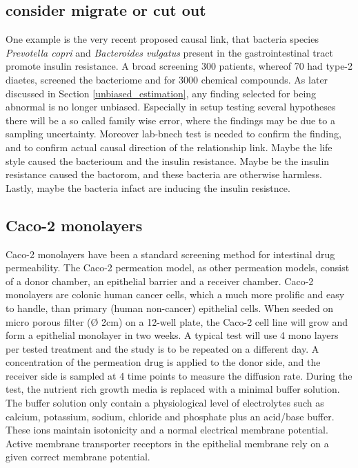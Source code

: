 \subsection{consider migrate or cut out}
One example is the very recent proposed causal link, that bacteria species \textit{Prevotella copri} and \textit{Bacteroides vulgatus} present in the gastrointestinal tract promote insulin resistance. A broad screening 300 patients, whereof 70 had type-2 diaetes, screened the bacteriome and for 3000 chemical compounds. As later discussed in Section \ref{unbiased_estimation}, any finding selected for being abnormal is no longer unbiased. Especially in setup testing several hypotheses there will be a so called family wise error, where the findings may be due to a sampling uncertainty. Moreover lab-bnech test is needed to confirm the finding, and to confirm actual causal direction of the relationship link. Maybe the life style caused the bacterioum and the insulin resistance. Maybe be the insulin resistance caused the bactorom, and these bacteria are otherwise harmless. Lastly, maybe the bacteria infact are inducing the insulin resistnce. \cite{pedersen2016human}


\subsection{Caco-2 monolayers}
Caco-2 monolayers have been a standard screening method for intestinal drug permeability. The Caco-2 permeation model, as other permeation models, consist of a donor chamber, an epithelial barrier and a receiver chamber. Caco-2 monolayers are colonic human cancer cells, which a much more prolific and easy to handle, than primary (human non-cancer) epithelial cells. When seeded on micro porous filter (Ø 2cm) on a 12-well plate, the Caco-2 cell line will grow and form a epithelial monolayer in two weeks. A typical test will use 4 mono layers per tested treatment and the study is to be repeated on a different day. A concentration of the permeation drug is applied to the donor side, and the receiver side is sampled at 4 time points to measure the diffusion rate. During the test, the nutrient rich growth media is replaced with a minimal buffer solution. The buffer solution only contain a physiological level of electrolytes such as calcium, potassium, sodium, chloride and phosphate plus an acid/base buffer. These ions maintain isotonicity and a normal electrical membrane potential. Active membrane transporter receptors in the epithelial membrane rely on a given correct membrane potential.

